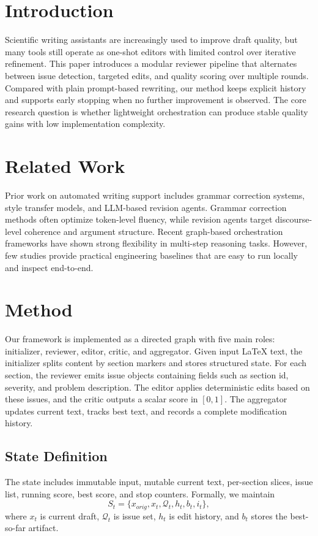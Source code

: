 \section{Introduction}
Scientific writing assistants are increasingly used to improve draft quality, but many tools still operate as one-shot editors with limited control over iterative refinement.
This paper introduces a modular reviewer pipeline that alternates between issue detection, targeted edits, and quality scoring over multiple rounds.
Compared with plain prompt-based rewriting, our method keeps explicit history and supports early stopping when no further improvement is observed.
The core research question is whether lightweight orchestration can produce stable quality gains with low implementation complexity.

\section{Related Work}
Prior work on automated writing support includes grammar correction systems, style transfer models, and LLM-based revision agents.
Grammar correction methods often optimize token-level fluency, while revision agents target discourse-level coherence and argument structure.
Recent graph-based orchestration frameworks have shown strong flexibility in multi-step reasoning tasks.
However, few studies provide practical engineering baselines that are easy to run locally and inspect end-to-end.

\section{Method}
Our framework is implemented as a directed graph with five main roles: initializer, reviewer, editor, critic, and aggregator.
Given input LaTeX text, the initializer splits content by section markers and stores structured state.
For each section, the reviewer emits issue objects containing fields such as section id, severity, and problem description.
The editor applies deterministic edits based on these issues, and the critic outputs a scalar score in $[0,1]$.
The aggregator updates current text, tracks best text, and records a complete modification history.

\subsection{State Definition}
The state includes immutable input, mutable current text, per-section slices, issue list, running score, best score, and stop counters.
Formally, we maintain
\[
S_t = \{x_{orig}, x_t, \mathcal{Q}_t, h_t, b_t, i_t\},
\]
where $x_t$ is current draft, $\mathcal{Q}_t$ is issue set, $h_t$ is edit history, and $b_t$ stores the best-so-far artifact.

